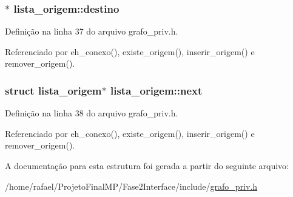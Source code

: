 \subsubsection[{destino}]{$\ast$ lista\+\_\+origem\+::destino}\label{structlista__origem_a2634ade77a03658b5cbc02e44d3e784f}


Definição na linha 37 do arquivo grafo\+\_\+priv.\+h.



Referenciado por eh\+\_\+conexo(), existe\+\_\+origem(), inserir\+\_\+origem() e remover\+\_\+origem().

\hypertarget{structlista__origem_a3d90d523832090d0a99ee45025c95c03}{}
\subsubsection[{next}]{\setlength{\rightskip}{0pt plus 5cm}struct {\bf lista\+\_\+origem}$\ast$ lista\+\_\+origem\+::next}\label{structlista__origem_a3d90d523832090d0a99ee45025c95c03}


Definição na linha 38 do arquivo grafo\+\_\+priv.\+h.



Referenciado por eh\+\_\+conexo(), existe\+\_\+origem(), inserir\+\_\+origem() e remover\+\_\+origem().



A documentação para esta estrutura foi gerada a partir do seguinte arquivo\+:\begin{DoxyCompactItemize}
\item 
/home/rafael/\+Projeto\+Final\+M\+P/\+Fase2\+Interface/include/\hyperlink{grafo__priv_8h}{grafo\+\_\+priv.\+h}\end{DoxyCompactItemize}
